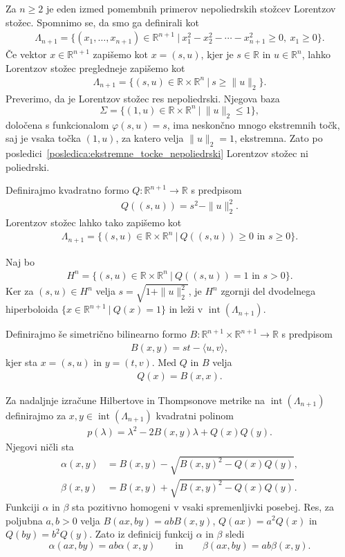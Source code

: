 \documentclass[mat2, tisk]{fmfdelo}
\newcommand{\R}{\mathbb{R}}
\begin{document}
Za $n\geq 2$ je eden izmed pomembnih primerov nepoliedrskih stožcev
Lorentzov stožec. Spomnimo se, da smo ga definirali kot
\begin{align*}
\Lambda_{n+1}
=
\{(x_1,\ldots,x_{n+1})\in\R^{n+1} ~|~
x_1^2-x_2^2-\cdots-x_{n+1}^2\geq0,\ x_1\geq0\}.
\end{align*}
Če vektor $x\in\R^{n+1}$ zapišemo kot $x=(s,u)$, kjer je
$s\in\R$ in $u\in\R^n$, lahko Lorentzov stožec pregledneje zapišemo kot
\begin{align*}
\Lambda_{n+1}
=
\{(s,u)\in\R\times\R^n ~|~ s\geq\|u\|_2\}.
\end{align*}
Preverimo, da je Lorentzov stožec res nepoliedrski.
Njegova baza
\[
\Sigma=
\{(1,u)\in\R\times\R^n ~|~ \|u\|_2\leq1\},
\]
določena s funkcionalom
$\varphi(s,u)=s$,
ima neskončno mnogo ekstremnih točk,
saj je vsaka točka $(1,u)$, za katero velja
$\|u\|_2=1$, ekstremna.
Zato po posledici~\ref{posledica:ekstremne_tocke_nepoliedrski}
Lorentzov stožec ni poliedrski.

Definirajmo kvadratno formo
$Q:\R^{n+1}\longrightarrow\R$ s predpisom
\begin{align*}
Q((s,u))
=
s^2-\|u\|_2^2.
\end{align*}
Lorentzov stožec lahko tako zapišemo kot
\begin{align*}
\Lambda_{n+1}
=
\{(s,u)\in\R\times\R^n ~|~
Q((s,u))\geq0 \text{ in } s\geq0\}.
\end{align*}

Naj bo
\begin{align*}
H^n
=
\{(s,u)\in\R\times\R^n ~|~
Q((s,u))=1 \text{ in } s>0\}.
\end{align*}
Ker za $(s,u)\in H^n$ velja
$s=\sqrt{1+\|u\|_2^2}$,
je $H^n$ zgornji del dvodelnega hiperboloida
$\{x\in\R^{n+1} ~|~ Q(x)=1\}$
in leži v $\operatorname{int}(\Lambda_{n+1})$.

Definirajmo še simetrično bilinearno formo
$B:\R^{n+1}\times\R^{n+1}\longrightarrow\R$ s predpisom
\begin{align*}
B(x,y)
=
st-\langle u,v\rangle,
\end{align*}
kjer sta $x=(s,u)$ in $y=(t,v)$. Med $Q$ in $B$ velja
\begin{align*}
Q(x)=B(x,x).
\end{align*}

Za nadaljnje izračune Hilbertove in Thompsonove metrike na
$\operatorname{int}(\Lambda_{n+1})$ definirajmo za
$x,y\in\operatorname{int}(\Lambda_{n+1})$ kvadratni polinom
\begin{align*}
p(\lambda)
=
\lambda^2-2B(x,y)\lambda+Q(x)Q(y).
\end{align*}
Njegovi ničli sta
\begin{align*}
\alpha(x,y)
&=
B(x,y)
-
\sqrt{B(x,y)^2-Q(x)Q(y)},\\
\beta(x,y)
&=
B(x,y)
+
\sqrt{B(x,y)^2-Q(x)Q(y)}.
\end{align*}
Funkciji $\alpha$ in $\beta$ sta pozitivno homogeni
v vsaki spremenljivki posebej.
Res, za poljubna $a,b>0$ velja
$B(ax,by)=abB(x,y)$,
$Q(ax)=a^2Q(x)$ in $Q(by)=b^2Q(y)$.
Zato iz definicij funkcij $\alpha$ in $\beta$ sledi
\[
\alpha(ax,by)=ab\alpha(x,y)
\qquad\text{in}\qquad
\beta(ax,by)=ab\beta(x,y).
\]
\end{document}
